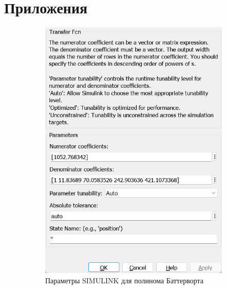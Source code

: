 \documentclass[a4paper, 12pt]{article}
\begin{document}
    \section{Приложения}
    \begin{figure}[H]
        \centering
        \begin{subfigure}{0.3\textwidth}
            \centering
            \includegraphics[width=\linewidth]{task1_baterwort_window.png}
            \caption{Параметры SIMULINK для полинома Баттерворта}
            \label{fig:t1bw}
        \end{subfigure}
        \begin{subfigure}{0.3\textwidth}
            \centering

\end{subfigure}
\end{figure}
\end{document}
